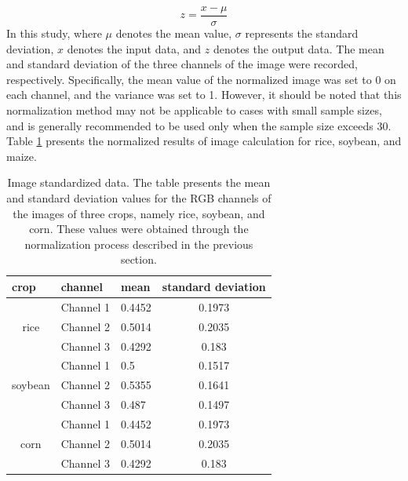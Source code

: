 \documentclass[acmsmall,manuscript, screen, review]{acmart}
\begin{document}
\begin{equation}
  z=\frac{x-\mu}{\sigma}
\end{equation}
In this study, where \begin{math}
  \mu
\end{math} denotes the mean value, \begin{math}
  \sigma
\end{math} represents the standard deviation, \begin{math}
  x
\end{math} denotes the input data, and \begin{math}
  z
\end{math} denotes the output data. The mean and standard deviation of the three channels of the image were recorded, respectively. Specifically, the mean value of the normalized image was set to 0 on each channel, and the variance was set to 1. However, it should be noted that this normalization method may not be applicable to cases with small sample sizes, and is generally recommended to be used only when the sample size exceeds 30. Table \ref{tab:image_standardized_data} presents the normalized results of image calculation for rice, soybean, and maize.

\begin{table}[htbp]
  \caption{Image standardized data. The table presents the mean and standard deviation values for the RGB channels of the images of three crops, namely rice, soybean, and corn. These values were obtained through the normalization process described in the previous section.}
  \label{tab:image_standardized_data}
  \begin{tabular}{lllc}
    \toprule
    crop                                            & channel   & mean   & standard deviation \\
    \midrule
    \multicolumn{1}{c}{\multirow{3}[1]{*}{rice}}    & Channel 1 & 0.4452 & 0.1973             \\
                                                    & Channel 2 & 0.5014 & 0.2035             \\
                                                    & Channel 3 & 0.4292 & 0.183              \\
    \midrule
    \multicolumn{1}{c}{\multirow{3}[0]{*}{soybean}} & Channel 1 & 0.5    & 0.1517             \\
                                                    & Channel 2 & 0.5355 & 0.1641             \\
                                                    & Channel 3 & 0.487  & 0.1497             \\
    \midrule
    \multicolumn{1}{c}{\multirow{3}[1]{*}{corn}}    & Channel 1 & 0.4452 & 0.1973             \\
                                                    & Channel 2 & 0.5014 & 0.2035             \\
                                                    & Channel 3 & 0.4292 & 0.183              \\
    \bottomrule
  \end{tabular}
\end{table}
\end{document}
